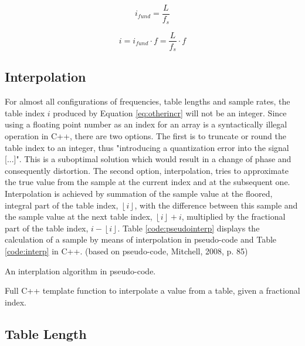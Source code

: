 \begin{equation}
  i_{fund} = \frac{L}{f_{s}}
  \label{eq:fundincr}
\end{equation}

\begin{equation}
  i = i_{fund} \cdot f = \frac{L}{f_{s}} \cdot f
  \label{eq:otherincr}
\end{equation}

\subsection{Interpolation}

For almost all configurations of frequencies, table lengths and sample rates, the table index $i$ produced by Equation \ref{eq:otherincr} will not be an integer. Since using a floating point number as an index for an array is a syntactically illegal operation in C++, there are two options. The first is to truncate or round the table index to an integer, thus "introducing a quantization error into the signal [...]".  This is a suboptimal solution which would result in a change of phase and consequently distortion.  The second option, interpolation, tries to approximate the true value from the sample at the current index and at the subsequent one. Interpolation is achieved by summation of the sample value at the floored, integral part of the table index, $\left \lfloor{i}\right \rfloor$, with the difference between this sample and the sample value at the next table index, $\left \lfloor {i}\right \rfloor + i$, multiplied by the fractional part of the table index, $i - \left \lfloor {i}\right \rfloor$. Table \ref{code:pseudointerp} displays the calculation of a sample by means of interpolation in pseudo-code and Table \ref{code:interp} in C++. (based on pseudo-code, Mitchell, 2008, p. 85)

\begin{table}
  \caption{An interplation algorithm in pseudo-code.}
  \label{code:pseudointerp}
\end{table}

\begin{table}
  \caption{Full C++ template function to interpolate a value from a table, given a fractional index. }
  \label{code:interp}
\end{table}

\subsection{Table Length}

